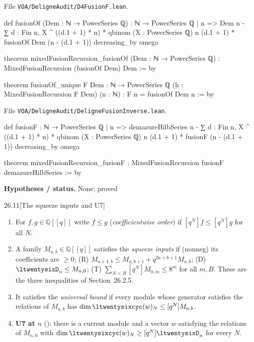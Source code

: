 \documentclass[11pt,openany]{book}
\newcommand{\lean}[1]{\texttt{\detokenize{#1}}}
\newcommand{\leanpath}[1]{\texttt{\small #1}}
\theoremstyle{definition}
\theoremstyle{plain}
\newcommand{\Q}{{\mathbb{Q}}}
\begin{document}
{\raggedright\noindent File \leanpath{VOA/\allowbreak DeligneAudit/\allowbreak D4FusionF.lean}.\par}
\begin{leancode}
def fusionOf (Dem : ℕ → PowerSeries ℚ) : ℕ → PowerSeries ℚ
  | n => Dem n -
      ∑ d : Fin n, X ^ ((d.1 + 1) * n) * qbinom (X : PowerSeries ℚ) n (d.1 + 1) *
        fusionOf Dem (n - (d.1 + 1))
decreasing_by omega

theorem mixedFusionRecursion_fusionOf (Dem : ℕ → PowerSeries ℚ) :
    MixedFusionRecursion (fusionOf Dem) Dem := by

theorem fusionOf_unique {F Dem : ℕ → PowerSeries ℚ} (h : MixedFusionRecursion F Dem) (n : ℕ) :
    F n = fusionOf Dem n := by
\end{leancode}
{\raggedright\noindent File \leanpath{VOA/\allowbreak DeligneAudit/\allowbreak DeligneFusionInverse.lean}.\par}
\begin{leancode}
def fusionF : ℕ → PowerSeries ℚ
  | n => demazureHilbSeries n -
      ∑ d : Fin n, X ^ ((d.1 + 1) * n) * qbinom (X : PowerSeries ℚ) n (d.1 + 1) * fusionF (n - (d.1 + 1))
decreasing_by omega

theorem mixedFusionRecursion_fusionF : MixedFusionRecursion fusionF demazureHilbSeries := by
\end{leancode}
\noindent\textbf{Hypotheses / status.} None; proved\par
\medskip
\begin{bdefinition}{26.11}[The squeeze inputs and U7]
\begin{enumerate}
\item[(a)] For $f,g\in\Q[[q]]$ write $f\le g$ (\emph{coefficientwise order}) if $[q^N]f\le[q^N]g$ for all $N$.
\item[(b)] A family $M_{a,b}\in\Q[[q]]$ satisfies the \emph{squeeze inputs} if (nonneg) its coefficients are $\ge0$;
(R) $M_{a+1,b}\le M_{a,b+1}+q^{2a+b+1}M_{a,b}$; (D) $\ltwentysixD_n\le M_{n,0}$; (T) $\sum_{N<B}[q^N]M_{0,m}\le8^m$ for all
$m,B$. These are the three inequalities of Section~26.2.5.
\item[(c)] It satisfies the \emph{universal bound} if every module whose generator satisfies the relations of $M_{a,b}$ has
$\dim\ltwentysixcyc(w)_N\le[q^N]M_{a,b}$.
\item[(d)] \textbf{U7 at $n$} (\lean{DemazureRealization n}): there is a current module and a vector $w$ satisfying the
relations of $M_{n,0}$ with $\dim\ltwentysixcyc(w)_N\ge[q^N]\ltwentysixD_n$ for every $N$.
\end{enumerate}
\end{bdefinition}
\end{document}
